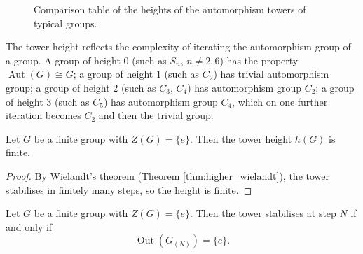 \begin{figure}[htbp]
\centering
{}
\caption{Comparison table of the heights of the automorphism towers of typical groups.}
\label{fig:tower_heights}
\end{figure}

\begin{remark}\label{rem:tower_height_structure}
The tower height reflects the complexity of iterating the automorphism group of a group. A group of height $0$ (such as $S_n$, $n\neq 2,6$) has the property $\operatorname{Aut}(G)\cong G$; a group of height $1$ (such as $C_2$) has trivial automorphism group; a group of height $2$ (such as $C_3$, $C_4$) has automorphism group $C_2$; a group of height $3$ (such as $C_5$) has automorphism group $C_4$, which on one further iteration becomes $C_2$ and then the trivial group.
\end{remark}

\begin{lemma}\label{lem:tower_height_finite}
Let $G$ be a finite group with $Z(G)=\{e\}$. Then the tower height $h(G)$ is finite.
\end{lemma}

\begin{proof}
By Wielandt's theorem (Theorem \ref{thm:higher_wielandt}), the tower stabilises in finitely many steps, so the height is finite.
\end{proof}

\begin{theorem}\label{thm:tower_stability_periodic}
Let $G$ be a finite group with $Z(G)=\{e\}$. Then the tower stabilises at step $N$ if and only if
\[
\operatorname{Out}(G_{(N)}) = \{e\}.
\]
\end{theorem}

